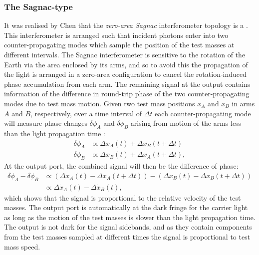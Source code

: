 \subsubsection{The Sagnac-type \SM{}}
It was realised by Chen that the \emph{zero-area Sagnac} interferometer topology is a \SM{} \cite{Chen2003}. This interferometer is arranged such that incident photons enter into two counter-propagating modes which sample the position of the test masses at different intervals. The Sagnac interferometer is sensitive to the rotation of the Earth via the area enclosed by its arms, and so to avoid this the propagation of the light is arranged in a zero-area configuration to cancel the rotation-induced phase accumulation from each arm. The remaining signal at the output contains information of the difference in round-trip phase of the two counter-propagating modes due to test mass motion. Given two test mass positions $x_{A}$ and $x_{B}$ in arms $A$ and $B$, respectively, over a time interval of $\Delta t$ each counter-propagating mode will measure phase changes $\delta \phi_{A}$ and $\delta \phi_{B}$ arising from motion of the arms less than the light propagation time \cite{Chen2003}:
\begin{align}
  \delta \phi_{A} &\propto \Delta x_{A} \left( t \right) + \Delta x_{B} \left( t + \Delta t \right) \\
  \delta \phi_{B} &\propto \Delta x_{B} \left( t \right) + \Delta x_{A} \left( t + \Delta t \right),
\end{align}
At the output port, the combined signal will then be the difference of phase:
\begin{equation}
  \begin{split}
    \delta \phi_{A} - \delta \phi_{B} &\propto \left( \Delta x_{A} \left( t \right) - \Delta x_{A} \left( t + \Delta t \right) \right) - \left( \Delta x_{B} \left( t \right) - \Delta x_{B} \left( t + \Delta t \right) \right) \\
                                      &\propto \Delta \dot{x}_{A} \left( t \right) - \Delta \dot{x}_{B} \left( t \right),
  \end{split}
\end{equation}
which shows that the signal is proportional to the relative velocity of the test masses. The output port is automatically at the dark fringe for the carrier light as long as the motion of the test masses is slower than the light propagation time. The output is not dark for the signal sidebands, and as they contain components from the test masses sampled at different times the signal is proportional to test mass speed.

